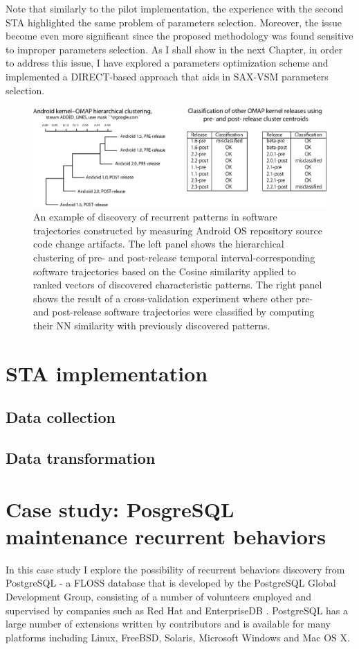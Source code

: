 Note that similarly to the pilot implementation, the experience with the second STA highlighted the same problem of 
parameters selection. Moreover, the issue become even more significant since the proposed methodology was found sensitive to 
improper parameters selection. As I shall show in the next Chapter, in order to address this issue, I have explored a parameters 
optimization scheme and implemented a DIRECT-based approach \cite{citeulike:12563460} that aids in SAX-VSM 
parameters selection.

\begin{figure}[t]
   \centering
   \includegraphics[width=145mm]{figures/STA2.eps}
   \caption{An example of discovery of recurrent patterns in software trajectories constructed by measuring Android OS 
   repository source code change artifacts.
   The left panel shows the hierarchical clustering of pre- and post-release temporal interval-corresponding software 
   trajectories based on the Cosine similarity applied to ranked vectors of discovered characteristic patterns.
   The right panel shows the result of a cross-validation experiment where other pre- and post-release software trajectories 
   were classified by computing their NN similarity with previously discovered patterns.}
   \label{fig:STA2-results}
\end{figure}

\section{STA implementation}
\subsection{Data collection}
\subsection{Data transformation}
\section{Case study: PosgreSQL maintenance recurrent behaviors}
In this case study I explore the possibility of recurrent behaviors discovery from PostgreSQL - a FLOSS database that 
is developed by the PostgreSQL Global Development Group, consisting of a number of volunteers employed and 
supervised by companies such as Red Hat and EnterpriseDB \cite{postgre-contrib}.
PostgreSQL has a large number of extensions written by contributors and is available for many platforms including 
Linux, FreeBSD, Solaris, Microsoft Windows and Mac OS X.

